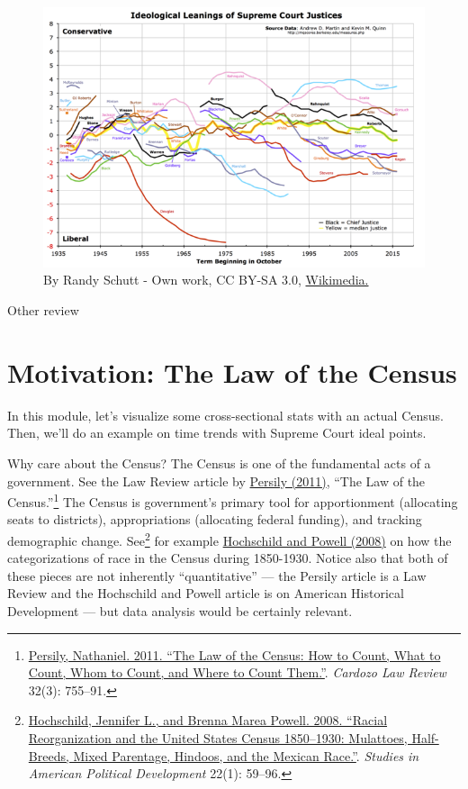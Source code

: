 \documentclass[]{book}
\let\rmarkdownfootnote\footnote%
\def\footnote{\protect\rmarkdownfootnote}
\theoremstyle{definition}
\theoremstyle{definition}
\theoremstyle{definition}
\theoremstyle{remark}
\begin{document}
\begin{figure}
\centering
\includegraphics{images/Martin-Quinn_Wikipedia.png}
\caption{By Randy Schutt - Own work, CC BY-SA 3.0, \href{https://commons.wikimedia.org/w/index.php?curid=29585342}{Wikimedia.}}
\end{figure}

Other review

\hypertarget{motivation-the-law-of-the-census}{%
\section{Motivation: The Law of the Census}\label{motivation-the-law-of-the-census}}

In this module, let's visualize some cross-sectional stats with an actual Census. Then, we'll do an example on time trends with Supreme Court ideal points.

Why care about the Census? The Census is one of the fundamental acts of a government. See the Law Review article by \href{http://cardozolawreview.com/Joomla1.5/content/32-3/Persily.32-3.pdf}{Persily (2011)}, ``The Law of the Census.''\footnote{\href{http://cardozolawreview.com/Joomla1.5/content/32-3/Persily.32-3.pdf}{Persily, Nathaniel. 2011. ``The Law of the Census: How to Count, What to Count, Whom to Count, and Where to Count Them.''}. \emph{Cardozo Law Review} 32(3): 755--91.} The Census is government's primary tool for apportionment (allocating seats to districts), appropriations (allocating federal funding), and tracking demographic change. See\footnote{\href{https://dash.harvard.edu/bitstream/handle/1/3153295/hoschschild_racialreorganization.pdf?sequence=2}{Hochschild, Jennifer L., and Brenna Marea Powell. 2008. ``Racial Reorganization and the United States Census 1850--1930: Mulattoes, Half-Breeds, Mixed Parentage, Hindoos, and the Mexican Race.''}. \emph{Studies in American Political Development} 22(1): 59--96.} for example \href{https://dash.harvard.edu/bitstream/handle/1/3153295/hoschschild_racialreorganization.pdf?sequence=2}{Hochschild and Powell (2008)} on how the categorizations of race in the Census during 1850-1930. Notice also that both of these pieces are not inherently ``quantitative'' --- the Persily article is a Law Review and the Hochschild and Powell article is on American Historical Development --- but data analysis would be certainly relevant.
\end{document}
